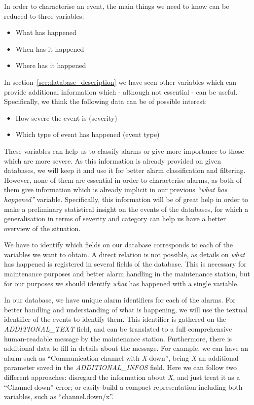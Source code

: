 In order to characterise an event, the main things we need to know can be reduced to three variables:
\begin{itemize}
\item What has happened
\item When has it happened
\item Where has it happened
\end{itemize}

In section~\ref{sec:database_description} we have seen other variables which can provide additional information which - although not essential - can be useful. Specifically, we think the following data can be of possible interest:

\begin{itemize}
\item How severe the event is (severity)
\item Which type of event has happened (event type)
\end{itemize}

These variables can help us to classify alarms or give more importance to those which are more severe. As this information is already provided on given databases, we will keep it and use it for better alarm classification and filtering. However, none of them are essential in order to characterise alarms, as both of them give information which is already implicit in our previous \emph{``what has happened''} variable. Specifically, this information will be of great help in order to make a preliminary statistical insight on the events of the databases, for which a generalisation in terms of severity and category can help us have a better overview of the situation.

We have to identify which fields on our database corresponds to each of the variables we want to obtain. A direct relation is not possible, as details on \emph{what} has happened is registered in several fields of the database. This is necessary for maintenance purposes and better alarm handling in the maintenance station, but for our purposes we should identify \emph{what} has happened with a single variable.

In our database, we have unique alarm identifiers for each of the alarms. For better handling and understanding of what is happening, we will use the textual identifier of the events to identify them. This identifier is gathered on the \emph{ADDITIONAL\_TEXT} field, and can be translated to a full comprehensive human-readable message by the maintenance station. Furthermore, there is additional data to fill in details about the message. For example, we can have an alarm such as ``Communication channel with \emph{X} down'', being \emph{X} an additional parameter saved in the \emph{ADDITIONAL\_INFOS} field. Here we can follow two different approaches: disregard the information about \emph{X}, and just treat it as a ``Channel down'' error; or easily build a compact representation including both variables, such as ``channel.down/x''.

